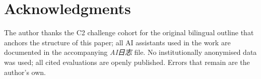\documentclass[11pt,a4paper]{article}
\begin{document}
\section*{Acknowledgments}
The author thanks the C2 challenge cohort for the original bilingual
outline that anchors the structure of this paper; all AI assistants
used in the work are documented in the accompanying \emph{AI日志} file.
No institutionally anonymised data was used; all cited evaluations
are openly published. Errors that remain are the author's own.


\end{document}

